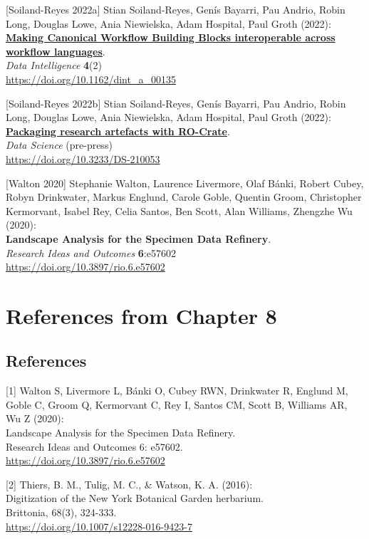 {[}Soiland-Reyes 2022a{]} Stian Soiland-Reyes, Genís Bayarri, Pau
Andrio, Robin Long, Douglas Lowe, Ania Niewielska, Adam Hospital, Paul
Groth (2022):\\
\href{../canonical-workflow-building-blocks/}{\textbf{Making Canonical
Workflow Building Blocks interoperable across workflow languages}}.\\
\emph{Data Intelligence} \textbf{4}(2)\\
\url{https://doi.org/10.1162/dint_a_00135}

{[}Soiland-Reyes 2022b{]} Stian Soiland-Reyes, Genís Bayarri, Pau
Andrio, Robin Long, Douglas Lowe, Ania Niewielska, Adam Hospital, Paul
Groth (2022):\\
\href{../ro-crate}{\textbf{Packaging research artefacts with
RO-Crate}}.\\
\emph{Data Science} (pre-press)\\
\url{https://doi.org/10.3233/DS-210053}

{[}Walton 2020{]} Stephanie Walton, Laurence Livermore, Olaf Bánki,
Robert Cubey, Robyn Drinkwater, Markus Englund, Carole Goble, Quentin
Groom, Christopher Kermorvant, Isabel Rey, Celia Santos, Ben Scott, Alan
Williams, Zhengzhe Wu (2020):\\
\textbf{Landscape Analysis for the Specimen Data Refinery}.\\
\emph{Research Ideas and Outcomes} \textbf{6}:e57602\\
\url{https://doi.org/10.3897/rio.6.e57602}


\section{References from Chapter 8}


\hypertarget{references-5}{%
\subsection{References}\label{references-5}}

{[}1{]} Walton S, Livermore L, Bánki O, Cubey RWN, Drinkwater R, Englund
M, Goble C, Groom Q, Kermorvant C, Rey I, Santos CM, Scott B, Williams
AR, Wu Z (2020):\\
Landscape Analysis for the Specimen Data Refinery.\\
Research Ideas and Outcomes 6: e57602.\\
\url{https://doi.org/10.3897/rio.6.e57602}

{[}2{]} Thiers, B. M., Tulig, M. C., \& Watson, K. A. (2016):\\
Digitization of the New York Botanical Garden herbarium.\\
Brittonia, 68(3), 324-333.\\
\url{https://doi.org/10.1007/s12228-016-9423-7}


